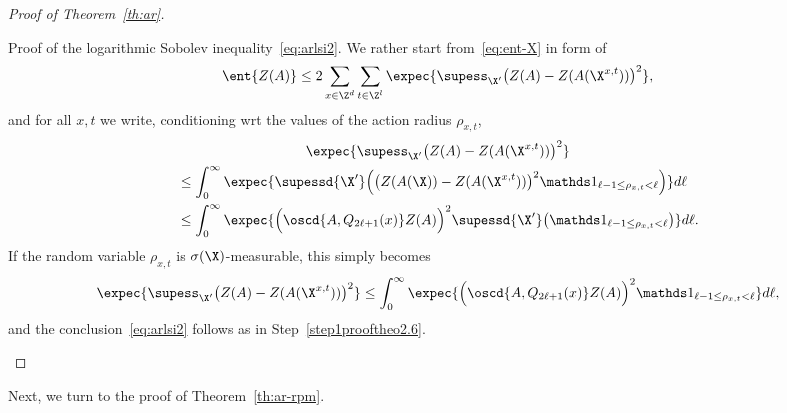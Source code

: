 \begin{proof}[Proof of Theorem~\ref{th:ar}]
\begin{step}{Proof of the logarithmic Sobolev inequality~\eqref{eq:arlsi2}.}
\noindent We rather start from~\eqref{eq:ent-X} in form of
\begin{equation}\label{eq:var-X-re}
\ent{Z(A)}\le2\sum_{x\in\Z^d}\sum_{t\in\Z^l}\expec{\supess_{\X'}\big(Z(A)-Z(A(\X^{x,t}))\big)^2},
\end{equation}
and for all $x,t$ we write, conditioning wrt the values of the action radius $\rho_{x,t}$,
\begin{multline*}
\expec{\supess_{\X'}\big(Z(A)-Z(A(\X^{x,t}))\big)^2}\\
\begin{aligned}
&\le\int_0^\infty\expec{\supessd{\X'}\Big(\big(Z(A(\X))-Z(A(\X^{x,t}))\big)^2\mathds1_{\ell-1\le \rho_{x,t}<\ell}\Big)}d\ell\\
&\le\int_0^\infty\expec{\Big(\oscd{A,Q_{2\ell+1}(x)}Z(A)\Big)^2\supessd{\X'}\big(\mathds1_{\ell-1\le \rho_{x,t}<\ell}\big)}d\ell.
\end{aligned}
\end{multline*}
If the random variable $\rho_{x,t}$ is $\sigma(\X)$-measurable, this simply becomes
\[
\expec{\supess_{\X'}\big(Z(A)-Z(A(\X^{x,t}))\big)^2}
\le\int_0^\infty\expec{\Big(\oscd{A,Q_{2\ell+1}(x)}Z(A)\Big)^2\mathds1_{\ell-1\le \rho_{x,t}<\ell}}d\ell,
\]
and the conclusion~\eqref{eq:arlsi2} follows as in Step~\ref{step1prooftheo2.6}.
\end{step}
\end{proof}

Next, we turn to the proof of Theorem~\ref{th:ar-rpm}.


